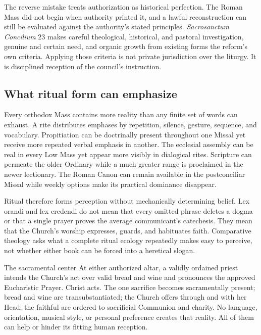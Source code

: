 The reverse mistake treats authorization as historical perfection. The Roman Mass did not begin when authority printed it, and a lawful reconstruction can still be evaluated against the authority's stated principles. \emph{Sacrosanctum Concilium} 23 makes careful theological, historical, and pastoral investigation, genuine and certain need, and organic growth from existing forms the reform's own criteria. Applying those criteria is not private jurisdiction over the liturgy. It is disciplined reception of the council's instruction.

\subsection{What ritual form can emphasize}

Every orthodox Mass contains more reality than any finite set of words can exhaust. A rite distributes emphases by repetition, silence, gesture, sequence, and vocabulary. Propitiation can be doctrinally present throughout one Missal yet receive more repeated verbal emphasis in another. The ecclesial assembly can be real in every Low Mass yet appear more visibly in dialogical rites. Scripture can permeate the older Ordinary while a much greater range is proclaimed in the newer lectionary. The Roman Canon can remain available in the postconciliar Missal while weekly options make its practical dominance disappear.

Ritual therefore forms perception without mechanically determining belief. Lex orandi and lex credendi do not mean that every omitted phrase deletes a dogma or that a single prayer proves the average communicant's catechesis. They mean that the Church's worship expresses, guards, and habituates faith. Comparative theology asks what a complete ritual ecology repeatedly makes easy to perceive, not whether either book can be forced into a heretical slogan.

\begin{studybox}{The sacramental center}
At either authorized altar, a validly ordained priest intends the Church's act over valid bread and wine and pronounces the approved Eucharistic Prayer. Christ acts. The one sacrifice becomes sacramentally present; bread and wine are transubstantiated; the Church offers through and with her Head; the faithful are ordered to sacrificial Communion and charity. No language, orientation, musical style, or personal preference creates that reality. All of them can help or hinder its fitting human reception.
\end{studybox}
